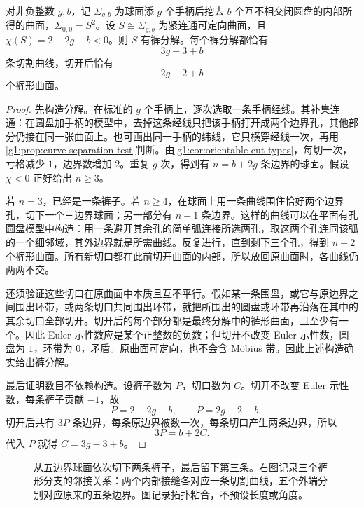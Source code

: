 \begin{theorem}\label{g1:thm:pants-decomposition}
	对非负整数 \(g,b\)，记 \(\Sigma_{g,b}\) 为球面添 \(g\) 个手柄后挖去 \(b\) 个互不相交闭圆盘的内部所得的曲面，\(\Sigma_{0,0}=S^2\)。设 \(S\cong\Sigma_{g,b}\) 为紧连通可定向曲面，且 \(\chi(S)=2-2g-b<0\)。则 \(S\) 有裤分解。每个裤分解都恰有
	\[
		3g-3+b
	\]
	条切割曲线，切开后恰有
	\[
		2g-2+b
	\]
	个裤形曲面。
\end{theorem}
\begin{proof}
	先构造分解。在标准的 \(g\) 个手柄上，逐次选取一条手柄经线。其补集连通：在圆盘加手柄的模型中，去掉这条经线只把该手柄打开成两个边界孔，其他部分仍接在同一张曲面上。也可画出同一手柄的纬线，它只横穿经线一次，再用\cref{g1:prop:curve-separation-test}判断。由\cref{g1:cor:orientable-cut-types}，每切一次，亏格减少 \(1\)，边界数增加 \(2\)。重复 \(g\) 次，得到有 \(n=b+2g\) 条边界的球面。假设 \(\chi<0\) 正好给出 \(n\ge3\)。

	若 \(n=3\)，已经是一条裤子。若 \(n\ge4\)，在球面上用一条曲线围住恰好两个边界孔，切下一个三边界球面；另一部分有 \(n-1\) 条边界。这样的曲线可以在平面有孔圆盘模型中构造：用一条避开其余孔的简单弧连接所选两孔，取这两个孔连同该弧的一个细邻域，其外边界就是所需曲线。反复进行，直到剩下三个孔，得到 \(n-2\) 个裤形曲面。所有新切口都在此前切开曲面的内部，所以放回原曲面时，各曲线仍两两不交。

	还须验证这些切口在原曲面中本质且互不平行。假如某一条围盘，或它与原边界之间围出环带，或两条切口共同围出环带，就把所围出的圆盘或环带再沿落在其中的其余切口全部切开。切开后的每个部分都是最终分解中的裤形曲面，且至少有一个。因此 Euler 示性数应是某个正整数的负数；但切开不改变 Euler 示性数，圆盘为 \(1\)，环带为 \(0\)，矛盾。原曲面可定向，也不会含 Möbius 带。因此上述构造确实给出裤分解。

	最后证明数目不依赖构造。设裤子数为 \(P\)，切口数为 \(C\)。切开不改变 Euler 示性数，每条裤子贡献 \(-1\)，故
	\[
		-P=2-2g-b,\qquad P=2g-2+b.
	\]
	切开后共有 \(3P\) 条边界，每条原边界被数一次，每条切口产生两条边界，所以
	\[
		3P=b+2C.
	\]
	代入 \(P\) 就得 \(C=3g-3+b\)。
\end{proof}

\begin{figure}[htbp]
	\centering
	
	\caption[五边界球面的裤分解]{从五边界球面依次切下两条裤子，最后留下第三条。右图记录三个裤形分支的邻接关系：两个内部接缝各对应一条切割曲线，五个外端分别对应原来的五条边界。图记录拓扑粘合，不预设长度或角度。}
	\label{g1:fig:pants-tree}
\end{figure}

